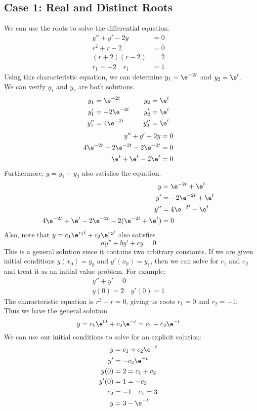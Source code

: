 \documentclass{math}
\begin{document}
\subsection*{Case 1: Real and Distinct Roots}
We can use the roots to solve the differential equation.
\begin{align*}
  y''+y'-2y &= 0 \\
  r^2+r-2 &= 0 \\
  (r+2)(r-2) &= 2 \\
  r_1 = -2 \quad r_1 &= 1
\end{align*}
Using this characteristic equation, we can determine \( y_1 = \e^{-2t} \) and
\( y_2 = \e^t \). We can verify \( y_1 \) and \( y_2 \) are both solutions.
\begin{align*}
  y_1 &= \e^{-2t} &\quad y_2 &= \e^t \\
  y_1' &= -2\e^{-2t} &\quad y_2' &= \e^t \\
  y_1'' &= 4\e^{-2t} &\quad y_2'' &= \e^t
\end{align*}
\begin{align*}
  y''+y'-2y &= 0 \\
  4\e^{-2t}-2\e^{-2t}-2\e^{-2t} &= 0 \\
  \e^t+\e^t-2\e^t &= 0
\end{align*}
Furthermore, \( y = y_1+y_2 \) also satisfies the equation.
\begin{align*}
  y &= \e^{-2t}+\e^t \\
  y' &= -2\e^{-2t}+\e^t \\
  y'' &= 4\e^{-2t}+\e^t \\
  4\e^{-2t}+\e^t-2\e^{-2t}-2(\e^{-2t}+\e^t) &= 0
\end{align*}
Also, note that \( y = c_1\e^{r_1t}+c_2\e^{r_2t} \) also satisfies
\[ ay''+by'+cy = 0 \]
This is a general solution since it contains two arbitrary constants. If we
are given initial conditions \( y(x_0) = y_0 \) and \( y'(x_0) = y_1 \), then
we can solve for \( c_1 \) and \( c_2 \) and treat it as an initial value
problem. For example:
\begin{gather*}
  y''+y' = 0 \\
  y(0) = 2 \quad y'(0) = 1
\end{gather*}
The characteristic equation is \( r^2+r = 0 \), giving us roots \( r_1 = 0 \)
and \( r_2 = -1 \). Thus we have the general solution
\[ y = c_1\e^{0t}+c_2\e^{-t} = c_1+c_2\e^{-t} \]
We can use our initial conditions to solve for an explicit solution:
\begin{align*}
  y &= c_1+c_2\e^{-t} \\
  y' &= -c_2\e^{-t} \\
  y(0) &= 2 = c_1+c_2 \\
  y'(0) &= 1 = -c_2 \\
  c_2 &= -1 \quad c_1 = 3 \\
  y &= 3-\e^{-t}
\end{align*}
\end{document}

